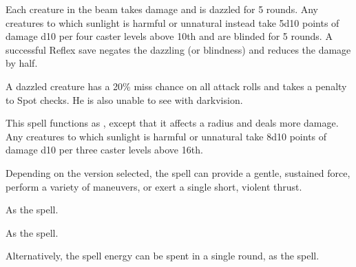 \begin{spelleffect}
  Each creature in the beam takes damage and is dazzled for 5 rounds. Any creatures to which sunlight is harmful or unnatural instead take 5d10 points of damage \add d10 per four caster levels above 10th and are blinded for 5 rounds. A successful Reflex save negates the dazzling (or blindness) and reduces the damage by half.
\end{spelleffect}
\begin{spellnotes}
  A dazzled creature has a 20\% miss chance on all attack rolls and takes a  penalty to Spot checks. He is also unable to see with darkvision. 
\end{spellnotes}

\spellrng{\rngmed}
\begin{spelleffect}
  This spell functions as , except that it affects a \areamed radius and deals more damage. Any creatures to which sunlight is harmful or unnatural take 8d10 points of damage \add d10 per three caster levels above 16th.
\end{spelleffect}

\begin{comment}
\subsubsection{T}
\end{comment}

\spellrng{\rngmed}
\begin{spelleffect}
  Depending on the version selected, the spell can provide a gentle, sustained force, perform a variety of maneuvers, or exert a single short, violent thrust.
  \par {} As the  spell.

  \par {} As the  spell.

  \par {} Alternatively, the spell energy can be spent in a single round, as the  spell.
\end{spelleffect}

